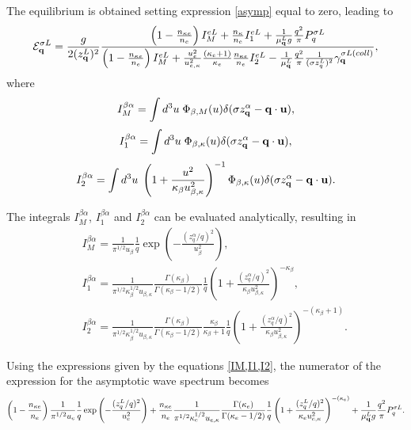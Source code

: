 \documentclass[12pt,a4paper,ruledheader]{report}
\begin{document}
\begin{appendix}
The equilibrium is obtained setting expression \eqref{asymp}
equal to zero, leading to
\begin{equation}
{\cal E}_{\bf q}^{\sigma L}=
\frac{g}{2(z_{\bf q}^L)^2}
\frac{\left(1-\frac{n_{\kappa e}}{n_e}\right)I_M^{eL}+\frac{n_\kappa}{n_e}I_1^{eL}
+\frac{1}{\mu_{\bf q}^L g}\frac{q^2}{\pi}
P_q^{\sigma L}}
{\left(1-\frac{n_{\kappa e}}{n_e}\right)I_M^{eL}
+\frac{u_e^2}{u_{e,\kappa}^2}\frac{(\kappa_e+1)}{\kappa_e}
\frac{n_{\kappa e}}{n_e}I_2^{eL}
-\frac{1}{\mu_{\bf q}^L}\frac{q^2}{\pi}
\frac{1}{(\sigma z_q^L)^2}
\gamma_{\bf q}^{\sigma L(coll)}},
\end{equation}
where
\begin{equation}
  I_M^{\beta\alpha}= \int d^3u\; \Phi_{\beta,M}(u)
\delta(\sigma z_{\bf q}^\alpha-{\bf q}\cdot{\bf u}),
\end{equation}
\begin{equation}
  I_1^{\beta\alpha}= \int d^3u\; \Phi_{\beta,\kappa}(u)
  \delta(\sigma z_{\bf q}^\alpha-{\bf q}\cdot{\bf u}),
\end{equation}
\begin{equation}
I_2^{\beta\alpha}= \int d^3u\;
\left(1+\frac{u^2}{\kappa_\beta u_{\beta,\kappa}^2}\right)^{-1}
\Phi_{\beta,\kappa}(u)\delta(\sigma z_{\bf q}^\alpha-{\bf q}\cdot{\bf u}).
\end{equation}

The integrals $I_M^{\beta\alpha}$, $I_1^{\beta\alpha}$ and 
$I_2^{\beta\alpha}$ can be evaluated analytically, resulting in
\begin{eqnarray}
\label{IM,I1,I2}
&&I_M^{\beta\alpha}= \frac{1}{\pi^{1/2} u_{\beta}}
\frac{1}{q}\exp\left(-\frac{(z_q^\alpha/q)^2}{u_{\beta}^2}\right),\\
&&I_1^{\beta\alpha}= \frac{1}{\pi^{1/2} \kappa_\beta^{1/2} u_{\beta,\kappa}}
\frac{\Gamma(\kappa_\beta)}{\Gamma(\kappa_\beta-1/2)}
\frac{1}{q}\left(1+\frac{(z_q^\alpha/q)^2}{\kappa_\beta u_{\beta,\kappa}^2}
\right)^{-\kappa_\beta},\nonumber\\
&&I_2^{\beta\alpha}= \frac{1}{\pi^{1/2} \kappa_\beta^{1/2} u_{\beta,\kappa}}
\frac{\Gamma(\kappa_\beta)}{\Gamma(\kappa_\beta-1/2)}
\frac{\kappa_\beta}{\kappa_\beta+1}
\frac{1}{q}\left(1+\frac{(z_q^\alpha/q)^2}{\kappa_\beta u_{\beta,\kappa}^2}
\right)^{-(\kappa_\beta+1)}\nonumber.
 \end{eqnarray}

Using the expressions given by the equations \eqref{IM,I1,I2}, the
numerator of the expression for the asymptotic wave spectrum becomes
\begin{eqnarray*}
  \left(1-\frac{n_{\kappa e}}{n_e}\right)
  \frac{1}{\pi^{1/2} u_{e}}\frac{1}{q}
  \exp\left(-\frac{(z_q^L/q)^2}{u_{e}^2}\right)
  +\frac{n_{\kappa e}}{n_e}
  \frac{1}{\pi^{1/2} \kappa_e^{1/2} u_{e,\kappa}}
  \frac{\Gamma(\kappa_e)}{\Gamma(\kappa_e-1/2)}
  \frac{1}{q}\left(1+\frac{(z_q^L/q)^2}{\kappa_e u_{e,\kappa}^2}
  \right)^{-(\kappa_e)}
  +\frac{1}{\mu_{\bf q}^L g}\frac{q^2}{\pi}
  P_q^{\sigma L}.
\end{eqnarray*}


\end{appendix}
\end{document}
